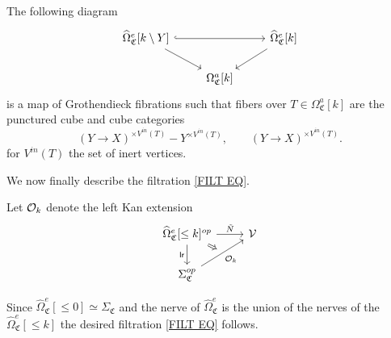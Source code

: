 \documentclass[a4paper,10pt
,draft
]{article}%
\renewcommand{\1}{\eta}%
\newcommand{\SC}{\Sigma_{\mathfrak C}}
\begin{document}
\begin{remark}
      \label{OEFIB REM}
      The following diagram
      \begin{equation}
            \begin{tikzcd}
                  \widehat\Omega_{\mathfrak C}^e[k \setminus Y] \arrow[rr, hookrightarrow] \arrow[dr]
                  &&
                  \widehat\Omega_{\mathfrak C}^e[k] \arrow[dl]
                  \\
                  &
                  \Omega_{\mathfrak C}^a[k]
            \end{tikzcd}
      \end{equation}
	is a map of Grothendieck fibrations
	such that fibers over $T \in \Omega_{\mathfrak C}^a[k]$ are the punctured cube and cube categories
      \begin{equation}
            (Y \to X)^{\times V^{in}(T)} - Y^{\times V^{in}(T)},
            \qquad
            (Y \to X)^{\times V^{in}(T)}.
      \end{equation}
	for $V^{in}(T)$ the set of inert vertices.
\end{remark}


We now finally describe the filtration \eqref{FILT EQ}.
\begin{definition}\label{FILTSTAGE DEF}
Let $\mathcal{O}_k$ denote the left Kan extension
\begin{equation}
\begin{tikzcd}
	|[alias = A]|
	\widehat\Omega_{\mathfrak C}^e[\leq k]^{op}
	\arrow[r, "\tilde N"] \arrow[d, "\mathsf{lr}"']
&
	\V
\\
	\SC^{op}
	\arrow[ur, "\O_k"', ""{name = B}]
	\arrow[Rightarrow, from = A, to = B]
\end{tikzcd}
\end{equation}
\end{definition}

Since $\widehat\Omega_{\mathfrak C}^e[\leq 0] \simeq \SC$
and the nerve of $\widehat \Omega_{\mathfrak C}^e$ is the union of the nerves of the $\widehat\Omega_{\mathfrak C}^e[\leq k]$
the desired filtration \eqref{FILT EQ} follows.
\end{document}
